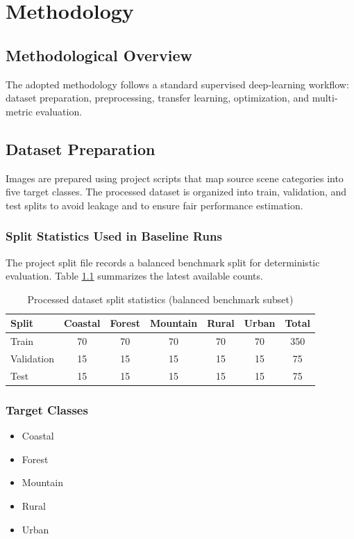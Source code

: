 \chapter{Methodology}

\section{Methodological Overview}
The adopted methodology follows a standard supervised deep-learning workflow: dataset preparation, preprocessing, transfer learning, optimization, and multi-metric evaluation.

\section{Dataset Preparation}
Images are prepared using project scripts that map source scene categories into five target classes. The processed dataset is organized into train, validation, and test splits to avoid leakage and to ensure fair performance estimation.

\subsection{Split Statistics Used in Baseline Runs}
The project split file records a balanced benchmark split for deterministic evaluation. Table \ref{tab:split-stats} summarizes the latest available counts.

\begin{table}[htbp]
\centering
\caption{Processed dataset split statistics (balanced benchmark subset)}
\label{tab:split-stats}
\begin{tabular}{lcccccc}
\toprule
Split & Coastal & Forest & Mountain & Rural & Urban & Total \\
\midrule
Train & 70 & 70 & 70 & 70 & 70 & 350 \\
Validation & 15 & 15 & 15 & 15 & 15 & 75 \\
Test & 15 & 15 & 15 & 15 & 15 & 75 \\
\bottomrule
\end{tabular}
\end{table}

\subsection{Target Classes}
\begin{itemize}
\item Coastal
\item Forest
\item Mountain
\item Rural
\item Urban
\end{itemize}

